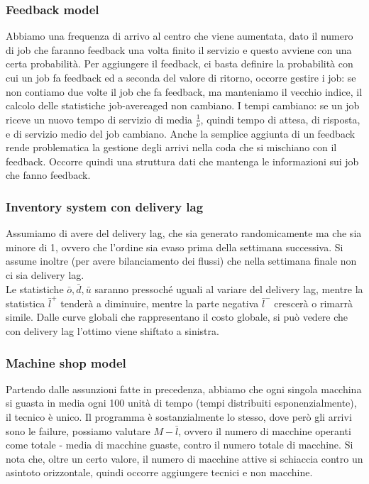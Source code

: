 \documentclass{article}
\begin{document}
\subsubsection{Feedback model}
Abbiamo una frequenza di arrivo al centro che viene aumentata, dato il numero di job che faranno feedback una volta finito il servizio e questo avviene con una certa probabilità. Per aggiungere il feedback, ci basta definire la probabilità con cui un job fa feedback ed a seconda del valore di ritorno, occorre gestire i job: se non contiamo due volte il job che fa feedback, ma manteniamo il vecchio indice, il calcolo delle statistiche job-avereaged non cambiano. I tempi cambiano: se un job riceve un nuovo tempo di servizio di media $\frac{1}{\nu}$, quindi tempo di attesa, di risposta, e di servizio medio del job cambiano. Anche la semplice aggiunta di un feedback rende problematica la gestione degli arrivi nella coda che si mischiano con il feedback. Occorre quindi una struttura dati che mantenga le informazioni sui job che fanno feedback.
\subsubsection{Inventory system con delivery lag}
Assumiamo di avere del delivery lag, che sia generato randomicamente ma che sia minore di 1, ovvero che l'ordine sia evaso prima della settimana successiva. Si assume inoltre (per avere bilanciamento dei flussi) che nella settimana finale non ci sia delivery lag.
\\ Le statistiche $\bar{o}, \bar{d}, \bar{u}$ saranno pressoché uguali al variare del delivery lag, mentre la statistica $\bar{l}^+$ tenderà a diminuire, mentre la parte negativa $\bar{l}^-$ crescerà o rimarrà simile. Dalle curve globali che rappresentano il costo globale, si può vedere che con delivery lag l'ottimo viene shiftato a sinistra.
\subsubsection{Machine shop model}
Partendo dalle assunzioni fatte in precedenza, abbiamo che ogni singola macchina si guasta in media ogni 100 unità di tempo (tempi distribuiti esponenzialmente), il tecnico è unico. Il programma è sostanzialmente lo stesso, dove però gli arrivi sono le failure, possiamo valutare $M - \bar{l}$, ovvero il numero di macchine operanti come totale - media di macchine guaste, contro il numero totale di macchine. Si nota che, oltre un certo valore, il numero di macchine attive si schiaccia contro un asintoto orizzontale, quindi occorre aggiungere tecnici e non macchine.
\end{document}
